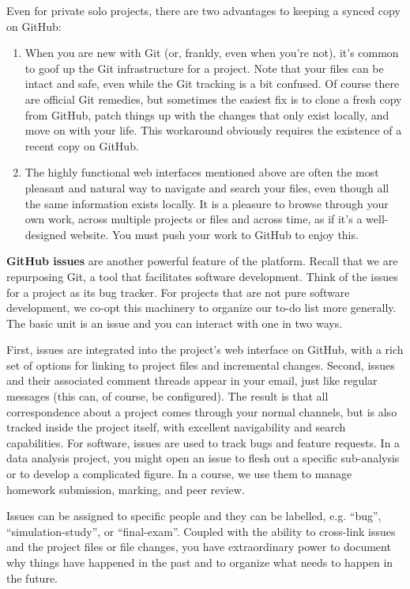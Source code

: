 \documentclass[12pt]{article}
\begin{document}
Even for private solo projects, there are two advantages to keeping a
synced copy on GitHub:

\begin{enumerate}
\def\labelenumi{\arabic{enumi}.}
\item
  When you are new with Git (or, frankly, even when you're not), it's
  common to goof up the Git infrastructure for a project. Note that your
  files can be intact and safe, even while the Git tracking is a bit
  confused. Of course there are official Git remedies, but sometimes the
  easiest fix is to clone a fresh copy from GitHub, patch things up with
  the changes that only exist locally, and move on with your life. This
  workaround obviously requires the existence of a recent copy on
  GitHub.
\item
  The highly functional web interfaces mentioned above are often the
  most pleasant and natural way to navigate and search your files, even
  though all the same information exists locally. It is a pleasure to
  browse through your own work, across multiple projects or files and
  across time, as if it's a well-designed website. You must push your
  work to GitHub to enjoy this.
\end{enumerate}

\textbf{GitHub issues} are another powerful feature of the platform.
Recall that we are repurposing Git, a tool that facilitates software
development. Think of the issues for a project as its bug tracker. For
projects that are not pure software development, we co-opt this
machinery to organize our to-do list more generally. The basic unit is
an issue and you can interact with one in two ways.

First, issues are integrated into the project's web interface on GitHub,
with a rich set of options for linking to project files and incremental
changes. Second, issues and their associated comment threads appear in
your email, just like regular messages (this can, of course, be
configured). The result is that all correspondence about a project comes
through your normal channels, but is also tracked inside the project
itself, with excellent navigability and search capabilities. For
software, issues are used to track bugs and feature requests. In a data
analysis project, you might open an issue to flesh out a specific
sub-analysis or to develop a complicated figure. In a course, we use
them to manage homework submission, marking, and peer review.

Issues can be assigned to specific people and they can be labelled, e.g.
``bug'', ``simulation-study'', or ``final-exam''. Coupled with the
ability to cross-link issues and the project files or file changes, you
have extraordinary power to document why things have happened in the
past and to organize what needs to happen in the future.
\end{document}
